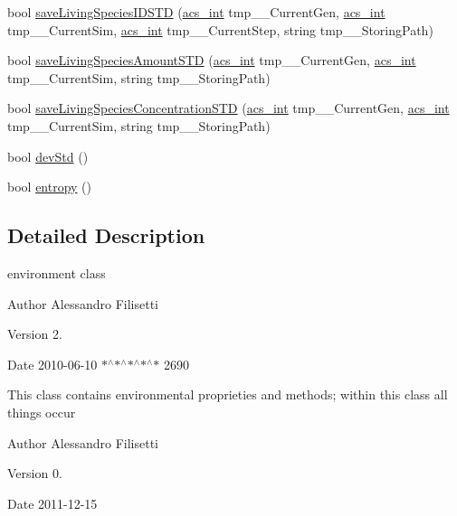 \begin{DoxyCompactItemize}
\item 
bool \hyperlink{classenvironment_a623c3cda23a18cb7b039c5a666408d72}{save\-Living\-Species\-I\-D\-S\-T\-D} (\hyperlink{acs__headers_8h_a8d277355641a098190360234e2ebde35}{acs\-\_\-int} tmp\-\_\-\-\_\-\-Current\-Gen, \hyperlink{acs__headers_8h_a8d277355641a098190360234e2ebde35}{acs\-\_\-int} tmp\-\_\-\-\_\-\-Current\-Sim, \hyperlink{acs__headers_8h_a8d277355641a098190360234e2ebde35}{acs\-\_\-int} tmp\-\_\-\-\_\-\-Current\-Step, string tmp\-\_\-\-\_\-\-Storing\-Path)
\item 
bool \hyperlink{classenvironment_a26c70b0a84c37c87952628d4a328c238}{save\-Living\-Species\-Amount\-S\-T\-D} (\hyperlink{acs__headers_8h_a8d277355641a098190360234e2ebde35}{acs\-\_\-int} tmp\-\_\-\-\_\-\-Current\-Gen, \hyperlink{acs__headers_8h_a8d277355641a098190360234e2ebde35}{acs\-\_\-int} tmp\-\_\-\-\_\-\-Current\-Sim, string tmp\-\_\-\-\_\-\-Storing\-Path)
\item 
bool \hyperlink{classenvironment_aedf8d90e1fe734948bf2213489840582}{save\-Living\-Species\-Concentration\-S\-T\-D} (\hyperlink{acs__headers_8h_a8d277355641a098190360234e2ebde35}{acs\-\_\-int} tmp\-\_\-\-\_\-\-Current\-Gen, \hyperlink{acs__headers_8h_a8d277355641a098190360234e2ebde35}{acs\-\_\-int} tmp\-\_\-\-\_\-\-Current\-Sim, string tmp\-\_\-\-\_\-\-Storing\-Path)
\item 
bool \hyperlink{classenvironment_ae7fd21d14f81c4854b3a6163b0278857}{dev\-Std} ()
\item 
bool \hyperlink{classenvironment_a4e9b60ec8b05e888cf0e55def03ee906}{entropy} ()
\end{DoxyCompactItemize}


\subsection{Detailed Description}
environment class 

\begin{DoxyAuthor}{Author}
Alessandro Filisetti 
\end{DoxyAuthor}
\begin{DoxyVersion}{Version}
2. 
\end{DoxyVersion}
\begin{DoxyDate}{Date}
2010-\/06-\/10 $\ast$$^\wedge$$\ast$$^\wedge$$\ast$$^\wedge$$\ast$$^\wedge$$\ast$ 2690
\end{DoxyDate}
This class contains environmental proprieties and methods; within this class all things occur \begin{DoxyAuthor}{Author}
Alessandro Filisetti 
\end{DoxyAuthor}
\begin{DoxyVersion}{Version}
0. 
\end{DoxyVersion}
\begin{DoxyDate}{Date}
2011-\/12-\/15 
\end{DoxyDate}


